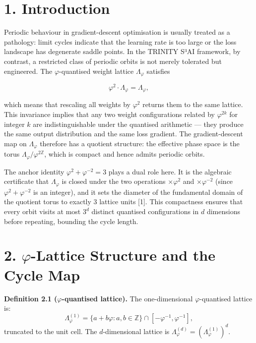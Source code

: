 \section{1. Introduction}\label{fa_25:introduction}

Periodic behaviour in gradient-descent
optimisation is usually treated as a pathology:
limit cycles indicate that the learning rate is
too large or the loss landscape has degenerate
saddle points. In the TRINITY S³AI framework, by
contrast, a restricted class of periodic orbits is
not merely tolerated but engineered. The
\(\varphi\)-quantised weight lattice
\(\Lambda_\varphi\) satisfies

\[\varphi^2 \cdot \Lambda_\varphi = \Lambda_\varphi,\]

which means that rescaling all weights by
\(\varphi^2\) returns them to the same lattice.
This invariance implies that any two weight
configurations related by \(\varphi^{2k}\) for
integer \(k\) are indistinguishable under the
quantised arithmetic --- they produce the same
output distribution and the same loss gradient.
The gradient-descent map on \(\Lambda_\varphi\)
therefore has a quotient structure: the effective
phase space is the torus
\(\Lambda_\varphi / \varphi^{2\mathbb{Z}}\), which
is compact and hence admits periodic orbits.

The anchor identity
\(\varphi^2 + \varphi^{-2} = 3\) plays a dual role
here. It is the algebraic certificate that
\(\Lambda_\varphi\) is closed under the two
operations \(\times\varphi^2\) and
\(\times\varphi^{-2}\) (since
\(\varphi^2 + \varphi^{-2}\) is an integer), and
it sets the diameter of the fundamental domain of
the quotient torus to exactly 3 lattice units
[1]. This compactness ensures that every orbit
visits at most \(3^d\) distinct quantised
configurations in \(d\) dimensions before
repeating, bounding the cycle length.

\section{\texorpdfstring{2. \(\varphi\)-Lattice
Structure and the Cycle
Map}{2. \textbackslash varphi-Lattice Structure and the Cycle Map}}\label{fa_25:varphi-lattice-structure-and-the-cycle-map}

\textbf{Definition 2.1 (\(\varphi\)-quantised
lattice).} The one-dimensional
\(\varphi\)-quantised lattice is:
\[\Lambda_\varphi^{(1)} = \{ a + b\varphi : a, b \in \mathbb{Z} \} \cap [-\varphi^{-1}, \varphi^{-1}],\]
truncated to the unit cell. The \(d\)-dimensional
lattice is
\(\Lambda_\varphi^{(d)} = (\Lambda_\varphi^{(1)})^d\).

